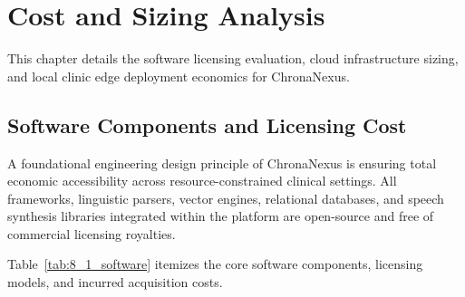 \chapter{Cost and Sizing Analysis}
\label{chap:cost_sizing}

This chapter details the software licensing evaluation, cloud infrastructure sizing, and local clinic edge deployment economics for ChronaNexus.

\section{Software Components and Licensing Cost}
\label{sec:software_cost}

A foundational engineering design principle of ChronaNexus is ensuring total economic accessibility across resource-constrained clinical settings. All frameworks, linguistic parsers, vector engines, relational databases, and speech synthesis libraries integrated within the platform are open-source and free of commercial licensing royalties.

Table~\ref{tab:8_1_software} itemizes the core software components, licensing models, and incurred acquisition costs.

